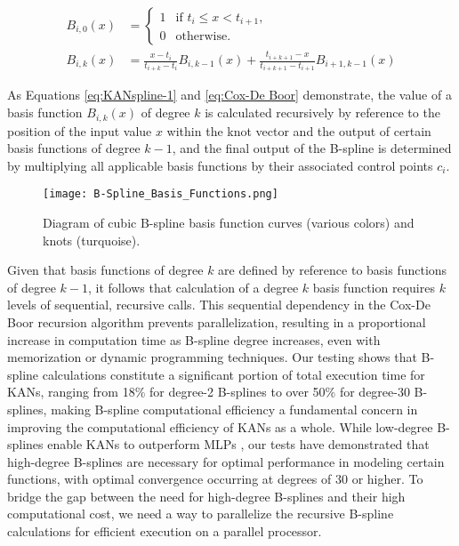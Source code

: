 \begin{small}
\begin{equation} \label{eq:Cox-De Boor}
\begin{split}
B_{i,0} (x) & =
\begin{cases}
1 & \text{if } t_i \leq x < t_{i+1},\\
0 & \text{otherwise.}
\end{cases} \\
B_{i,k} (x) & = \frac{x - t_i}{t_{i+k} - t_i} B_{i, k-1} (x) + \frac{t_{i+k+1} - x}{t_{i+k+1} - t_{i+1}} B_{i+1, k-1} (x)
\end{split}
\end{equation}
\end{small}

As Equations \ref{eq:KANspline-1} and \ref{eq:Cox-De Boor} demonstrate, the value of a basis function \(B_{i,k} (x)\) of degree \(k\) is calculated recursively by reference to the position of the input value \(x\) within the knot vector and the output of certain basis functions of degree \(k-1\), and the final output of the B-spline is determined by multiplying all applicable basis functions by their associated control points \(c_i\).
\begin{figure} [ht]
\begin{center}
\centerline{\texttt{[image: B-Spline\_Basis\_Functions.png]}}
\caption{Diagram of cubic B-spline basis function curves (various colors) and knots (turquoise).}
\label{fig:b-spline basis functions}
\end{center}
\end{figure}

Given that basis functions of degree \(k\) are defined by reference to basis functions of degree \(k - 1\), it follows that calculation of a degree \(k\) basis function requires \(k\) levels of sequential, recursive calls. This sequential dependency in the Cox-De Boor recursion algorithm prevents parallelization, resulting in a proportional increase in computation time as B-spline degree increases, even with memorization or dynamic programming techniques. Our testing shows that B-spline calculations constitute a significant portion of total execution time for KANs, ranging from 18\% for degree-2 B-splines to over 50\% for degree-30 B-splines, making B-spline computational efficiency a fundamental concern in improving the computational efficiency of KANs as a whole. While low-degree B-splines enable KANs to outperform MLPs \cite{liu2024, peng2024, hu2024}, our tests have demonstrated that high-degree B-splines are necessary for optimal performance in modeling certain functions, with optimal convergence occurring at degrees of 30 or higher. 
To bridge the gap between the need for high-degree B-splines and their high computational cost, we need a way to parallelize the recursive B-spline calculations for efficient execution on a parallel processor.

